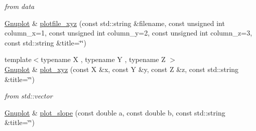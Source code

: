 \begin{DoxyCompactItemize}
\begin{DoxyCompactList}\small\item\em from data \end{DoxyCompactList}\item 
\hyperlink{classkukadu_1_1Gnuplot}{Gnuplot} \& \hyperlink{classkukadu_1_1Gnuplot_a03b4eec7a72bc05abfcdfd7bcd61513b}{plotfile\+\_\+xyz} (const std\+::string \&filename, const unsigned int column\+\_\+x=1, const unsigned int column\+\_\+y=2, const unsigned int column\+\_\+z=3, const std\+::string \&title=\char`\"{}\char`\"{})
\item 
{\footnotesize template$<$typename X , typename Y , typename Z $>$ }\\\hyperlink{classkukadu_1_1Gnuplot}{Gnuplot} \& \hyperlink{classkukadu_1_1Gnuplot_ac3e5d63b5a9729d5e609e45abc65520f}{plot\+\_\+xyz} (const X \&x, const Y \&y, const Z \&z, const std\+::string \&title=\char`\"{}\char`\"{})\hypertarget{classkukadu_1_1Gnuplot_ac3e5d63b5a9729d5e609e45abc65520f}{}\label{classkukadu_1_1Gnuplot_ac3e5d63b5a9729d5e609e45abc65520f}

\begin{DoxyCompactList}\small\item\em from std\+::vector \end{DoxyCompactList}\item 
\hyperlink{classkukadu_1_1Gnuplot}{Gnuplot} \& \hyperlink{classkukadu_1_1Gnuplot_aaddc220bf3a1726a962c801a1218b826}{plot\+\_\+slope} (const double a, const double b, const std\+::string \&title=\char`\"{}\char`\"{})\hypertarget{classkukadu_1_1Gnuplot_aaddc220bf3a1726a962c801a1218b826}{}\label{classkukadu_1_1Gnuplot_aaddc220bf3a1726a962c801a1218b826}


\end{DoxyCompactItemize}
